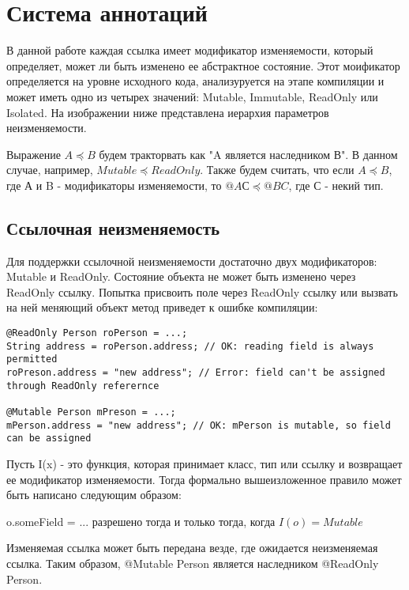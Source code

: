 \section{Система аннотаций}

В данной работе каждая ссылка имеет модификатор изменяемости, который определяет, может ли быть изменено ее абстрактное состояние. Этот моификатор определяется на уровне исходного кода, анализуруется на этапе компиляции и может иметь одно из четырех значений: Mutable, Immutable, ReadOnly или Isolated. На изображении ниже представлена иерархия параметров неизменяемости. 

Выражение $A \preceq B$ будем тракторвать как "A является наследником В". В данном случае, например, $Mutable \preceq ReadOnly$. Также будем считать, что если $A \preceq B$, где А и B - модификаторы изменяемости, то $@A С \preceq @B C$, где С - некий тип.

\subsection{Ссылочная неизменяемость}

Для поддержки ссылочной неизменяемости достаточно двух модификаторов: Mutable и ReadOnly. Состояние объекта не может быть изменено через ReadOnly ссылку. Попытка присвоить поле через ReadOnly ссылку или вызвать на ней меняющий объект метод приведет к ошибке компиляции:

\begin{lstlisting}[caption=Mutable и RadOnly ссылки, label=code:mutable_vs_readonly]
@ReadOnly Person roPerson = ...;
String address = roPerson.address; // OK: reading field is always permitted
roPreson.address = "new address"; // Error: field can't be assigned through ReadOnly referernce

@Mutable Person mPreson = ...;
mPerson.address = "new address"; // OK: mPerson is mutable, so field can be assigned
\end{lstlisting} 

Пусть I(x) - это функция, которая принимает класс, тип или ссылку и возвращает ее модификатор изменяемости. Тогда формально вышеизложенное правило может быть написано следующим образом:

\begin{Rule}\label{rule:assign_field}
o.someField = ... разрешено тогда и только тогда, когда $I(o) = Mutable$ 
\end{Rule}

Изменяемая ссылка может быть передана везде, где ожидается неизменяемая ссылка. Таким образом, @Mutable Person является наследником @ReadOnly Person.

